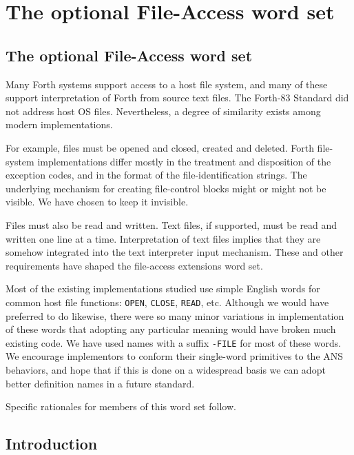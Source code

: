 \chapter{The optional File-Access word set} %

\begin{info}
\section{The optional File-Access word set}

Many Forth systems support access to a host file system, and many of
these support interpretation of Forth from source text files. The
Forth-83 Standard did not address host OS files. Nevertheless, a degree
of similarity exists among modern implementations.

For example, files must be opened and closed, created and deleted.
Forth file-system implementations differ mostly in the treatment and
disposition of the exception codes, and in the format of the
file-identification strings. The underlying mechanism for creating
file-control blocks might or might not be visible. We have chosen to
keep it invisible.

Files must also be read and written. Text files, if supported, must
be read and written one line at a time. Interpretation of text files
implies that they are somehow integrated into the text interpreter
input mechanism. These and other requirements have shaped the
file-access extensions word set.

Most of the existing implementations studied use simple English words
for common host file functions: \texttt{OPEN}, \texttt{CLOSE},
\texttt{READ}, etc. Although we would have preferred to do likewise,
there were so many minor variations in implementation of these words
that adopting any particular meaning would have broken much existing
code. We have used names with a suffix \texttt{-FILE} for most of these
words. We encourage implementors to conform their single-word primitives
to the ANS behaviors, and hope that if this is done on a widespread
basis we can adopt better definition names in a future standard.

Specific rationales for members of this word set follow.


\end{info}

\section{Introduction} %

